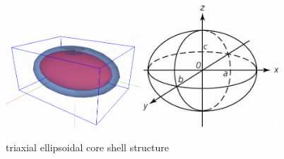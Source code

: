 \begin{figure}[htb]
\begin{center}
\includegraphics[width=0.45\textwidth,height=0.32177\textwidth]{../images/form_factor/Ellipsoid/triaxEll.png}
\hspace{0.08\textwidth}
\includegraphics[width=0.45\textwidth,height=0.4096\textwidth]{../images/form_factor/Ellipsoid/A4ellipd.png}
\end{center}
\caption{triaxial ellipsoidal core shell structure} \label{triaEllShell}
\end{figure}

